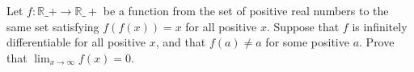 Let $f : \mathbb{R}\_+ \to \mathbb{R}\_+$ be a function from the set of positive
real numbers to the same set satisfying $f(f(x)) = x$ for all positive $x$.
Suppose that $f$ is infinitely differentiable for all positive $x$, and that
$f(a) \ne a$ for some positive $a$. Prove that $\displaystyle{\lim_{x \to \infty} f(x) = 0}$.
